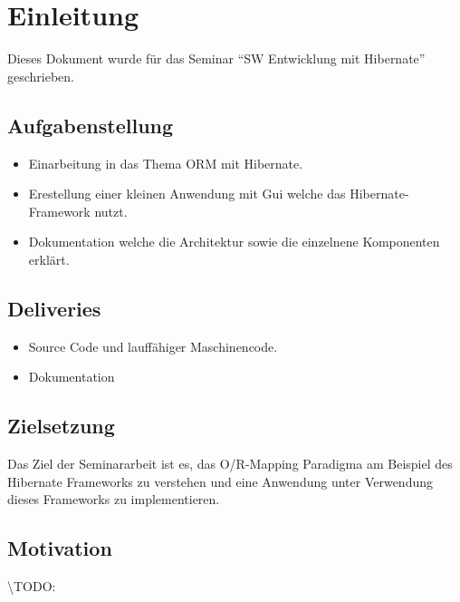 \chapter{Einleitung}
\label{sec:Einleitung}
Dieses Dokument wurde für das Seminar \enquote{SW Entwicklung mit Hibernate} geschrieben.

\section{Aufgabenstellung}
\begin{itemize}
	\item Einarbeitung in das Thema ORM mit Hibernate.
	\item Erestellung einer kleinen Anwendung mit Gui welche das Hibernate-Framework nutzt.
	\item Dokumentation welche die Architektur sowie die einzelnene Komponenten erklärt.
\end{itemize}


\section{Deliveries}
\begin{itemize}
	\item Source Code und lauffähiger Maschinencode.
	\item Dokumentation
\end{itemize}

\section{Zielsetzung}
Das Ziel der Seminararbeit ist es, das O/R-Mapping Paradigma am Beispiel des Hibernate Frameworks zu verstehen und eine Anwendung unter Verwendung dieses Frameworks zu implementieren.

\section{Motivation}
\backslash TODO:
